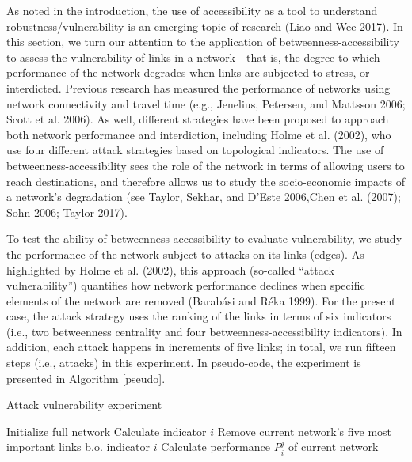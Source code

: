 \documentclass[]{elsarticle} %
\begin{document}
As noted in the introduction, the use of accessibility as a tool to
understand robustness/vulnerability is an emerging topic of research
(Liao and Wee 2017). In this section, we turn our attention to the
application of betweenness-accessibility to assess the vulnerability of
links in a network - that is, the degree to which performance of the
network degrades when links are subjected to stress, or interdicted.
Previous research has measured the performance of networks using network
connectivity and travel time (e.g., Jenelius, Petersen, and Mattsson
2006; Scott et al. 2006). As well, different strategies have been
proposed to approach both network performance and interdiction,
including Holme et al. (2002), who use four different attack strategies
based on topological indicators. The use of betweenness-accessibility
sees the role of the network in terms of allowing users to reach
destinations, and therefore allows us to study the socio-economic
impacts of a network's degradation (see Taylor, Sekhar, and D'Este
2006,Chen et al. (2007); Sohn 2006; Taylor 2017).

To test the ability of betweenness-accessibility to evaluate
vulnerability, we study the performance of the network subject to
attacks on its links (edges). As highlighted by Holme et al. (2002),
this approach (so-called ``attack vulnerability'') quantifies how
network performance declines when specific elements of the network are
removed (Barabási and Réka 1999). For the present case, the attack
strategy uses the ranking of the links in terms of six indicators (i.e.,
two betweenness centrality and four betweenness-accessibility
indicators). In addition, each attack happens in increments of five
links; in total, we run fifteen steps (i.e., attacks) in this
experiment. In pseudo-code, the experiment is presented in Algorithm
\ref{pseudo}.

\begin{algorithm}
\caption{Attack vulnerability experiment}
\begin{algorithmic}[1]
\State Initialize full network
\State Calculate indicator $i$ 
\State Remove current network's five most important links b.o. indicator $i$
\State Calculate performance $P_i^j$ of current network
\EndFor
\EndFor
\end{algorithmic}
\label{pseudo}
\end{algorithm}
\end{document}
